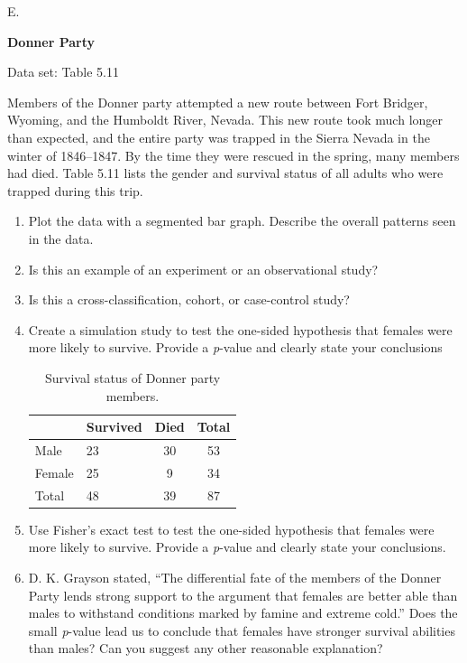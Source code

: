 \documentclass[
]{report}
\newcounter{excount}
\renewcommand{\theexcount}{E\arabic{excount}}
\begin{document}
\begin{list}{\theexcount.}{ \setlength{\itemsep}{0.5em}}
  \item \textbf{Donner Party}    

  Data set: Table 5.11    

  Members of the Donner party attempted a new route between Fort Bridger, Wyoming, and the Humboldt River, Nevada. This new route took much longer than expected, and the entire party was trapped in the Sierra Nevada in the winter of 1846–1847. By the time they were rescued in the spring, many members had died. Table 5.11 lists the gender and survival status of all adults who were trapped during this trip.  
  \begin{enumerate}
    \item Plot the data with a segmented bar graph. Describe the overall patterns seen in the data.
    \item Is this an example of an experiment or an observational study?
    \item Is this a cross-classification, cohort, or case-control study?
    \item Create a simulation study to test the one-sided hypothesis that females were more likely to survive. Provide a \textit{p}-value and clearly state your conclusions
\begin{table}[!h]
\centering
\caption{\label{tab:tab11}Survival status of Donner party members.}
\centering
\begin{tabular}[t]{llcc}
\toprule
  & Survived & Died & Total\\
\midrule
Male & 23 & 30 & 53\\
Female & 25 & 9 & 34\\
Total & 48 & 39 & 87\\
\bottomrule
\end{tabular}
\end{table}


    \item Use Fisher’s exact test to test the one-sided hypothesis that females were more likely to survive. Provide a \textit{p}-value and clearly state your conclusions.
    \item D. K. Grayson stated, “The differential fate of the members of the Donner Party lends strong support to the argument that females are better able than males to withstand conditions marked by famine and extreme cold.” Does the small \textit{p}-value lead us to conclude that females have stronger survival abilities than males? Can you suggest any other reasonable explanation?
  \end{enumerate}


\end{list}
\end{document}

